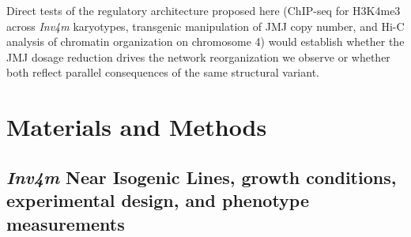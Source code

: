 \documentclass[9pt,twocolumn,twoside]{rilabRxiv}
\newcommand{\invfour}{\textit{Inv4m}\xspace}
\begin{document}
Direct tests of the regulatory architecture proposed here (ChIP-seq for H3K4me3 across \invfour karyotypes, transgenic manipulation of JMJ copy number, and Hi-C analysis of chromatin organization on chromosome 4) would establish whether the JMJ dosage reduction drives the network reorganization we observe or whether both reflect parallel consequences of the same structural variant.

\section{Materials and Methods}
\label{sec:materials:methods}

\subsection{\invfour Near Isogenic Lines, growth conditions, experimental
design, and phenotype measurements}
\end{document}
